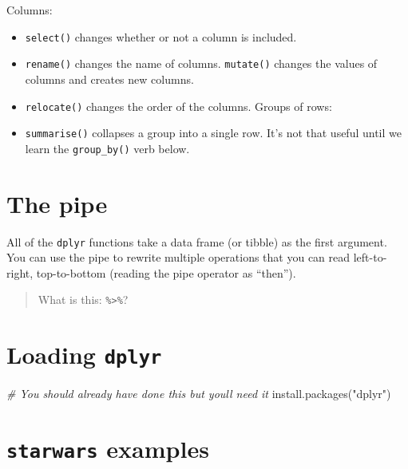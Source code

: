 \documentclass[
]{book}
\newenvironment{Shaded}{\begin{snugshade}}{\end{snugshade}}
\newcommand{\CommentTok}[1]{\textcolor[rgb]{0.56,0.35,0.01}{\textit{#1}}}
\newcommand{\FunctionTok}[1]{\textcolor[rgb]{0.00,0.00,0.00}{#1}}
\newcommand{\NormalTok}[1]{#1}
\newcommand{\StringTok}[1]{\textcolor[rgb]{0.31,0.60,0.02}{#1}}
\providecommand{\tightlist}{%
  \setlength{\itemsep}{0pt}\setlength{\parskip}{0pt}}
\begin{document}
Columns:

\begin{itemize}
\tightlist
\item
  \texttt{select()} changes whether or not a column is included.
\item
  \texttt{rename()} changes the name of columns.
  \texttt{mutate()} changes the values of columns and creates new columns.
\item
  \texttt{relocate()} changes the order of the columns.
  Groups of rows:
\item
  \texttt{summarise()} collapses a group into a single row. It's not that useful until we learn the \texttt{group\_by()} verb below.
\end{itemize}

\hypertarget{the-pipe}{%
\section{The pipe}\label{the-pipe}}

All of the \texttt{dplyr} functions take a data frame (or tibble) as the first argument. You can use the pipe to rewrite multiple operations that you can read left-to-right, top-to-bottom (reading the pipe operator as ``then'').

\begin{quote}
What is this: \texttt{\%\textgreater{}\%}?
\end{quote}

\hypertarget{loading-dplyr}{%
\section{\texorpdfstring{Loading \texttt{dplyr}}{Loading dplyr}}\label{loading-dplyr}}

\begin{Shaded}
\begin{Highlighting}[]
\CommentTok{\# You should already have done this but you\textquotesingle{}ll need it}
\FunctionTok{install.packages}\NormalTok{(}\StringTok{"dplyr"}\NormalTok{)}
\end{Highlighting}
\end{Shaded}

\hypertarget{starwars-examples}{%
\section{\texorpdfstring{\texttt{starwars} examples}{starwars examples}}\label{starwars-examples}}
\end{document}
